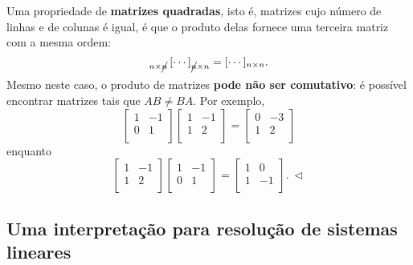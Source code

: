\documentclass[../livro.tex]{subfiles}  %
\begin{document}
\begin{example}
	Uma propriedade de \textbf{matrizes quadradas}, isto é, matrizes cujo número de linhas e de colunas é igual, é que o produto delas fornece uma terceira matriz com a mesma ordem:
	\begin{equation}
	[\cdots]_{n \times \cancel{n}} \, [\cdots]_{\cancel{n} \times n} = [\cdots]_{n \times n}.
	\end{equation} Mesmo neste caso, o produto de matrizes \textbf{pode não ser comutativo}: é possível encontrar matrizes tais que $AB \neq BA$. Por exemplo,
	\begin{equation}
	\left[
	\begin{array}{cc}
	1 & -1  \\
	0 &  1  \\
	\end{array}
	\right]
	\left[
	\begin{array}{cc}
	1 & -1  \\
	1 &  2  \\
	\end{array}
	\right] =
	\left[
	\begin{array}{cc}
	0 & -3  \\
	1 &  2  \\
	\end{array}
	\right]
	\end{equation} enquanto
	\begin{equation}
	\left[
	\begin{array}{cc}
	1 & -1  \\
	1 &  2  \\
	\end{array}
	\right]
	\left[
	\begin{array}{cc}
	1 & -1  \\
	0 &  1  \\
	\end{array}
	\right] =
	\left[
	\begin{array}{cc}
	1 & 0  \\
	1 & -1  \\
	\end{array}
	\right]. \ \lhd
	\end{equation}
\end{example}





\subsection{Uma interpretação para resolução de sistemas lineares}\label{scn:resolucao-2-sistemas}
\end{document}
